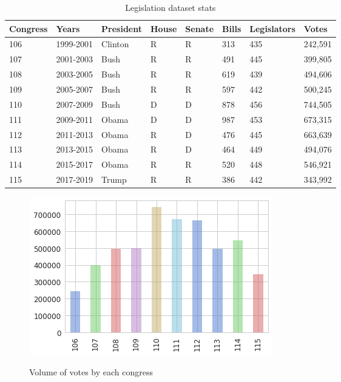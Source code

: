 \begin{table}[htbp]
\centering
\begin{tabular}{l|lllllll}
\toprule
Congress & Years & President & House & Senate & Bills & Legislators & Votes \\
\midrule
106      &   1999-2001    & Clinton &   R   &   R     &  313  &  435 &  242,591  \\
107      &   2001-2003    & Bush    &   R   &   R     &  491  &  445 &  399,805  \\
108      &   2003-2005    & Bush    &   R   &   R     &  619  &  439 &  494,606  \\
109      &   2005-2007    & Bush    &   R   &   R     &  597  &  442 &  500,245  \\
110      &   2007-2009    & Bush    &   D   &   D     &  878  &  456 &  744,505  \\
111      &   2009-2011    & Obama   &   D   &   D     &  987  &  453 &  673,315  \\
112      &   2011-2013    & Obama   &   R   &   D     &  476  &  445 &  663,639  \\
113      &   2013-2015    & Obama   &   R   &   D     &  464  &  449 &  494,076  \\
114      &   2015-2017    & Obama   &   R   &   R     &  520  &  448 &  546,921  \\
115      &   2017-2019    & Trump   &   R   &   R     &  386  &  442 &  343,992  \\
\bottomrule
\end{tabular}
\caption{Legislation dataset stats}
\label{tab:legislationDataset}
\end{table}


\begin{figure}[H]
\centering
\caption{Volume of votes by each congress}
\includegraphics[scale=.7]{img/congress-votes.png}
\label{fig:congress-votes}
\end{figure}

